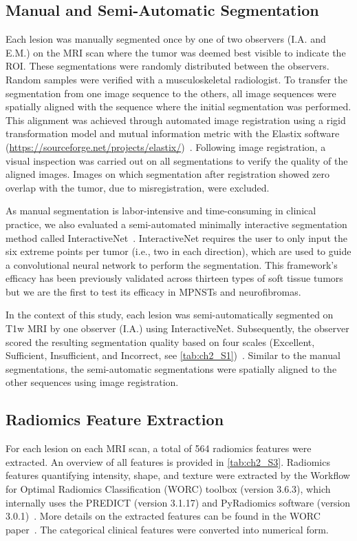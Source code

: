 \subsection{Manual and Semi-Automatic Segmentation}
Each lesion was manually segmented once by one of two observers (I.A. and E.M.) on the MRI scan where the tumor was deemed best visible to indicate the ROI.
These segmentations were randomly distributed between the observers.
Random samples were verified with a musculoskeletal radiologist.
To transfer the segmentation from one image sequence to the others, all image sequences were spatially aligned with the sequence where the initial segmentation was performed.
This alignment was achieved through automated image registration using a rigid transformation model and mutual information metric with the Elastix software (\url{https://sourceforge.net/projects/elastix/})~\autocite{klein2010}.
Following image registration, a visual inspection was carried out on all segmentations to verify the quality of the aligned images.
Images on which segmentation after registration showed zero overlap with the tumor, due to misregistration, were excluded.

As manual segmentation is labor-intensive and time-consuming in clinical practice, we also evaluated a semi-automated minimally interactive segmentation method called InteractiveNet~\autocite{spaanderman2025}.
InteractiveNet requires the user to only input the six extreme points per tumor (i.e., two in each direction), which are used to guide a convolutional neural network to perform the segmentation.
This framework's efficacy has been previously validated across thirteen types of soft tissue tumors but we are the first to test its efficacy in MPNSTs and neurofibromas.

In the context of this study, each lesion was semi-automatically segmented on T1w MRI by one observer (I.A.) using InteractiveNet.
Subsequently, the observer scored the resulting segmentation quality based on four scales (Excellent, Sufficient, Insufficient, and Incorrect, see \autoref{tab:ch2_S1})~\autocite{spaanderman2025}.
Similar to the manual segmentations, the semi-automatic segmentations were spatially aligned to the other sequences using image registration.

\subsection{Radiomics Feature Extraction}
For each lesion on each MRI scan, a total of 564 radiomics features were extracted.
An overview of all features is provided in \autoref{tab:ch2_S3}.
Radiomics features quantifying intensity, shape, and texture were extracted by the Workflow for Optimal Radiomics Classification (WORC) toolbox (version 3.6.3), which internally uses the PREDICT (version 3.1.17) and PyRadiomics software (version 3.0.1)~\autocite{starmans2018worc,vandervoort2018predict,vangriethuysen2017,starmans2021}.
More details on the extracted features can be found in the WORC paper~\autocite{starmans2021}.
The categorical clinical features were converted into numerical form.

